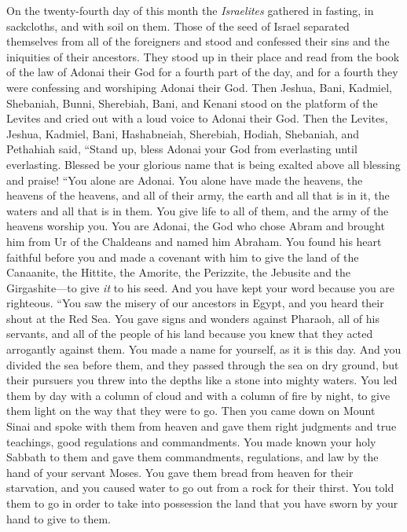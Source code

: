 \begin{biblechapter} %
 On the twenty-fourth day of this month the \textit{Israelites} gathered in fasting, in sackcloths, and with soil on them.
\verse Those of the seed of Israel separated themselves from all of the foreigners and stood and confessed their sins and the iniquities of their ancestors.
\verse They stood up in their place and read from the book of the law of Adonai their God for a fourth part of the day, and for a fourth they were confessing and worshiping Adonai their God.
\verse Then Jeshua, Bani, Kadmiel, Shebaniah, Bunni, Sherebiah, Bani, and Kenani stood on the platform of the Levites and cried out with a loud voice to Adonai their God.
\verse Then the Levites, Jeshua, Kadmiel, Bani, Hashabneiah, Sherebiah, Hodiah, Shebaniah, and Pethahiah said, “Stand up, bless Adonai your God from everlasting until everlasting. Blessed be your glorious name that is being exalted above all blessing and praise!
\verse “You alone are Adonai. You alone have made the heavens, the heavens of the heavens, and all of their army, the earth and all that is in it, the waters and all that is in them. You give life to all of them, and the army of the heavens worship you.
\verse You are Adonai, the God who chose Abram and brought him from Ur of the Chaldeans and named him Abraham.
\verse You found his heart faithful before you and made a covenant with him to give the land of the Canaanite, the Hittite, the Amorite, the Perizzite, the Jebusite and the Girgashite—to give \textit{it} to his seed. And you have kept your word because you are righteous.
\verse “You saw the misery of our ancestors in Egypt, and you heard their shout at the Red Sea.
\verse You gave signs and wonders against Pharaoh, all of his servants, and all of the people of his land because you knew that they acted arrogantly against them. You made a name for yourself, as it is this day.
\verse And you divided the sea before them, and they passed through the sea on dry ground, but their pursuers you threw into the depths like a stone into mighty waters.
\verse You led them by day with a column of cloud and with a column of fire by night, to give them light on the way that they were to go.
\verse Then you came down on Mount Sinai and spoke with them from heaven and gave them right judgments and true teachings, good regulations and commandments.
\verse You made known your holy Sabbath to them and gave them commandments, regulations, and law by the hand of your servant Moses.
\verse You gave them bread from heaven for their starvation, and you caused water to go out from a rock for their thirst. You told them to go in order to take into possession the land that you have sworn by your hand to give to them.

\end{biblechapter}
